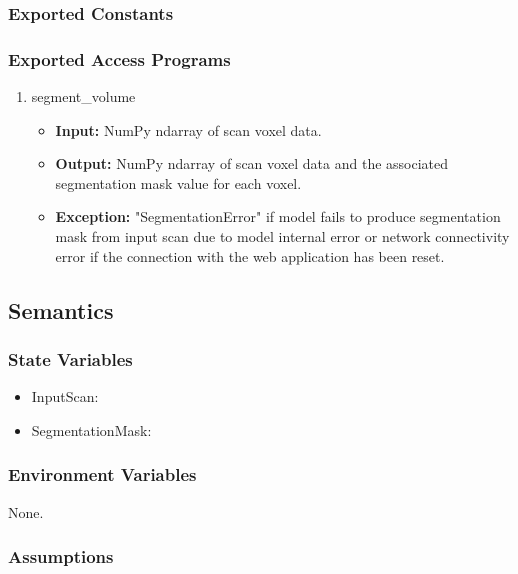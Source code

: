 \documentclass[12pt, titlepage]{article}
\begin{document}
\subsubsection{Exported Constants}

\subsubsection{Exported Access Programs}

\begin{enumerate}
  \item segment\_volume
        \begin{itemize}
          \item \textbf{Input:} NumPy ndarray of scan voxel data.
          \item \textbf{Output:} NumPy ndarray of scan voxel data and the associated segmentation mask value for each voxel.
          \item \textbf{Exception:} "SegmentationError" if model fails to produce segmentation mask from input scan due to
                model internal error or network connectivity error if the connection with the web application has been reset.
        \end{itemize}
\end{enumerate}

\subsection{Semantics}

\subsubsection{State Variables}

\begin{itemize}
  \item InputScan:
  \item SegmentationMask:
\end{itemize}

\subsubsection{Environment Variables}

None.

\subsubsection{Assumptions}
\end{document}

